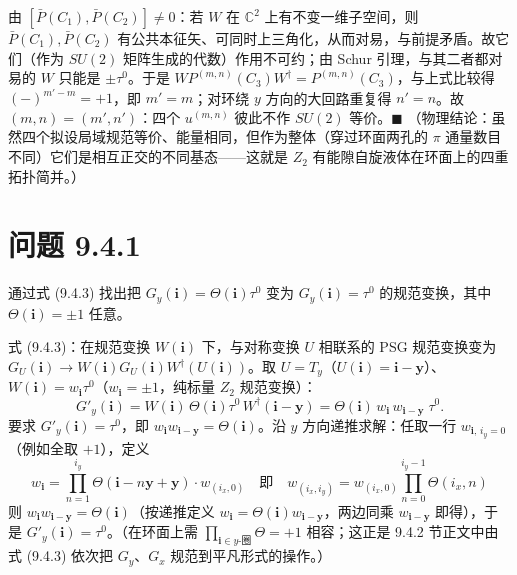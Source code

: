 由 $[\bar P(C_1),\bar P(C_2)]\neq0$：若 $W$ 在 $\mathbb{C}^2$ 上有不变一维子空间，则 $\bar P(C_1),\bar P(C_2)$ 有公共本征矢、可同时上三角化，从而对易，与前提矛盾。故它们（作为 $SU(2)$ 矩阵生成的代数）作用不可约；由 Schur 引理，与其二者都对易的 $W$ 只能是 $\pm\tau^0$。于是 $W P^{(m,n)}(C_3)W^{\dagger}=P^{(m,n)}(C_3)$，与上式比较得 $(-)^{m'-m}=+1$，即 $m'=m$；对环绕 $y$ 方向的大回路重复得 $n'=n$。故 $(m,n)=(m',n')$：四个 $u^{(m,n)}$ 彼此不作 $SU(2)$ 等价。$\blacksquare$
（物理结论：虽然四个拟设局域规范等价、能量相同，但作为整体（穿过环面两孔的 $\pi$ 通量数目不同）它们是相互正交的不同基态——这就是 $Z_2$ 有能隙自旋液体在环面上的四重拓扑简并。）

\section*{问题 9.4.1}
\begin{problem}
通过式 (9.4.3) 找出把 $G_y(\pmb{i})=\Theta(\pmb{i})\tau^0$ 变为 $G_y(\pmb{i})=\tau^0$ 的规范变换，其中 $\Theta(\pmb{i})=\pm1$ 任意。
\end{problem}
\solution
式 (9.4.3)：在规范变换 $W(\pmb{i})$ 下，与对称变换 $U$ 相联系的 PSG 规范变换变为 $G_U(\pmb{i})\to W(\pmb{i})G_U(\pmb{i})W^{\dagger}(U(\pmb{i}))$。取 $U=T_y$（$U(\pmb{i})=\pmb{i}-\pmb{y}$）、$W(\pmb{i})=w_{\pmb{i}}\tau^0$（$w_{\pmb{i}}=\pm1$，纯标量 $Z_2$ 规范变换）：
\begin{equation*}
G'_y(\pmb{i})=W(\pmb{i})\,\Theta(\pmb{i})\tau^0\,W^{\dagger}(\pmb{i}-\pmb{y})
=\Theta(\pmb{i})\,w_{\pmb{i}}\,w_{\pmb{i}-\pmb{y}}\;\tau^0 .
\end{equation*}
要求 $G'_y(\pmb{i})=\tau^0$，即 $w_{\pmb{i}}w_{\pmb{i}-\pmb{y}}=\Theta(\pmb{i})$。沿 $y$ 方向递推求解：任取一行 $w_{\pmb{i},\,i_y=0}$（例如全取 $+1$），定义
\begin{equation*}
\boxed{\;w_{\pmb{i}}=\prod_{n=1}^{i_y}\Theta(\pmb{i}-n\pmb{y}+\pmb{y})\cdot w_{(i_x,0)}
\quad\text{即}\quad w_{(i_x,i_y)}=w_{(i_x,0)}\prod_{n=0}^{i_y-1}\Theta(i_x,n)\;}
\end{equation*}
则 $w_{\pmb{i}}w_{\pmb{i}-\pmb{y}}=\Theta(\pmb{i})$（按递推定义 $w_{\pmb{i}}=\Theta(\pmb{i})w_{\pmb{i}-\pmb{y}}$，两边同乘 $w_{\pmb{i}-\pmb{y}}$ 即得），于是 $G'_y(\pmb{i})=\tau^0$。（在环面上需 $\prod_{\pmb{i}\in y\text{-圈}}\Theta=+1$ 相容；这正是 9.4.2 节正文中由式 (9.4.3) 依次把 $G_y$、$G_x$ 规范到平凡形式的操作。）


